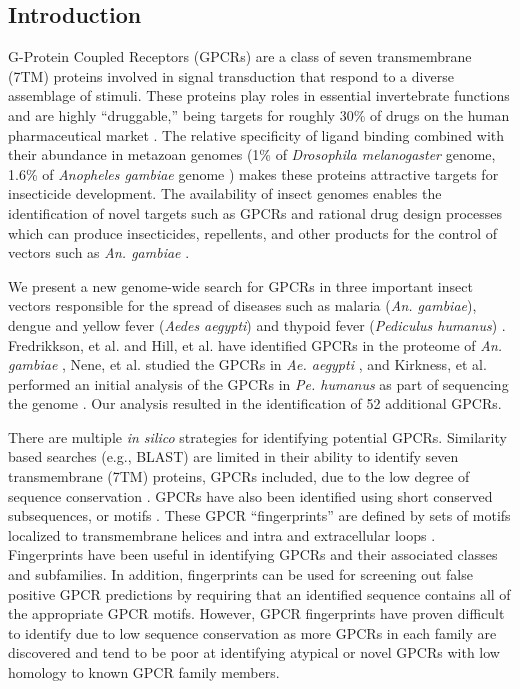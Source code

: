 \subsection{Introduction}

G-Protein Coupled Receptors (GPCRs) are a class of seven transmembrane (7TM) proteins involved in signal transduction \cite{Pierce2002, Broeck2001} that respond to a diverse assemblage of stimuli.  These proteins play roles in essential invertebrate functions and are highly ``druggable,'' being targets for roughly 30\% of drugs on the human pharmaceutical market \cite{Wise2002}. The relative specificity of ligand binding combined with their abundance in metazoan genomes (1\% of \emph{Drosophila melanogaster} genome, 1.6\% of \emph{Anopheles gambiae} genome \cite{Adams2000, Hill2002}) makes these proteins attractive targets for insecticide development. The availability of insect genomes enables the identification of novel targets such as GPCRs and rational drug design processes which can produce insecticides, repellents, and other products for the control of vectors such as \emph{An. gambiae} \cite{Grimmelikhuijzen2007, Justice2003}.

We present a new genome-wide search for GPCRs in three important insect vectors responsible for the spread of diseases such as malaria (\emph{An. gambiae}), dengue and yellow fever (\emph{Aedes aegypti}) and thypoid fever (\emph{Pediculus humanus}) \cite{Fournier2002, Foucault2006, Grimmelikhuijzen2007}. Fredrikkson, et al. and Hill, et al. have identified GPCRs in the proteome of \emph{An. gambiae} \cite{Fredriksson2005, Hill2002}, Nene, et al. studied the GPCRs in \emph{Ae. aegypti} \cite{Nene2007}, and Kirkness, et al. performed an initial analysis of the GPCRs in \emph{Pe. humanus} as part of sequencing the genome \cite{Kirkness2010}.  Our analysis resulted in the identification of 52 additional GPCRs.

There are multiple \textit{in silico} strategies for identifying potential GPCRs. Similarity based searches (e.g., BLAST) are limited in their ability to identify seven transmembrane (7TM) proteins, GPCRs included, due to the low degree of sequence conservation \cite{Pierce2002, Davies2007}. GPCRs have also been identified using short conserved subsequences, or motifs \cite{Davies2007}. These GPCR ``fingerprints'' are defined by sets of motifs localized to transmembrane helices and intra and extracellular loops \cite{Attwood2001,Flower2004,Huang2003}. Fingerprints have been useful in identifying GPCRs and their associated classes and subfamilies. In addition, fingerprints can be used for screening out false positive GPCR predictions by requiring that an identified sequence contains all of the appropriate GPCR motifs.  However, GPCR fingerprints have proven difficult to identify due to low sequence conservation as more GPCRs in each family are discovered and tend to be poor at identifying atypical or novel GPCRs with low homology to known GPCR family members.

